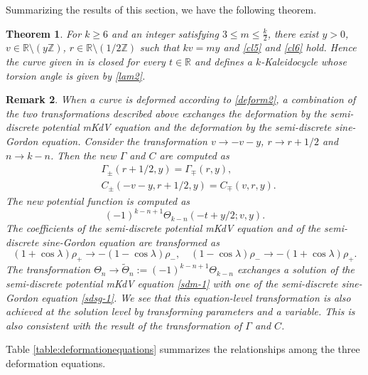 \documentclass[10pt,leqno]{amsart}
\newcommand{\R}{\mathbb{R}}
\newtheorem{theorem}{Theorem}[section]
\newtheorem{remark}[theorem]{Remark}
\numberwithin{equation}{section}
\begin{document}
Summarizing the results of this section, we have the following theorem.
\begin{theorem}\label{thm:kaleidocycle}
For $k\geq 6$ and an integer satisfying
$3\le m\le \frac{k}{2}$,
there exist $y>0$, $v \in \R \setminus{(y\mathbb{Z})}$, $r \in \R \setminus{(1/2\mathbb{Z})}$
such that
$kv=my$ and \eqref{cl5} and \eqref{cl6} hold.
Hence the curve given in  is closed for every $t\in\mathbb R$
and defines a $k$-Kaleidocycle whose
torsion angle is given by \eqref{lam2}.
\end{theorem}
\begin{remark}\label{remark:mKdVandsG}
When a curve is deformed according to \eqref{deform2}, a combination of the two transformations described above exchanges the deformation by the semi-discrete potential mKdV equation and the deformation by the semi-discrete sine-Gordon equation.
Consider the transformation $v\rightarrow -v-y$, $r\rightarrow r+1/2$ and $n\rightarrow k-n$.
Then the new $\Gamma$ and $C$ are computed as
\begin{equation}\label{transGammaC}
    \begin{split}
        &\Gamma_{\pm}\left(r+1/2,y\right)=\Gamma_{\mp}\left(r,y\right),\\
        &C_{\pm}\left(-v-y,r+1/2,y\right)=C_{\mp}\left(v,r,y\right).
    \end{split}
\end{equation}
The new potential function is computed as
\begin{equation}
 (-1)^{k-n+1}\Theta_{k-n}\left(-t+y/2;v,y\right).
\end{equation}
The coefficients of the semi-discrete potential mKdV equation and of the semi-discrete sine-Gordon equation are transformed as
\begin{equation}
    \left(1+\cos\lambda\right)\rho_{+}\rightarrow -\left(1-\cos\lambda\right)\rho_{-},\quad\left(1-\cos\lambda\right)\rho_{-}\rightarrow -\left(1+\cos\lambda\right)\rho_{+}.
\end{equation}
The transformation $\Theta_n\rightarrow\widetilde{\Theta}_{n}:=(-1)^{k-n+1}\Theta_{k-n}$ exchanges a solution of the semi-discrete potential mKdV equation \eqref{sdm-1} with one of the semi-discrete sine-Gordon equation \eqref{sdsg-1}. 
We see that this equation-level transformation is also achieved at the solution level by transforming parameters and a variable.
This is also consistent with the result of the transformation of $\Gamma$ and $C$.
\end{remark}
Table \ref{table:deformationequations} summarizes the relationships among the three deformation equations.
\end{document}

